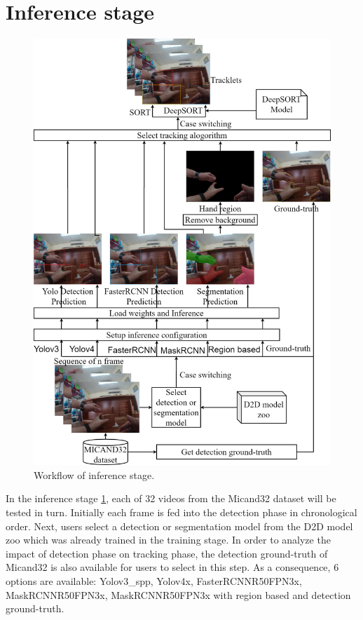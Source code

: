 \section{Inference stage}\label{sec:inferstage}
\begin{figure}[htbp]
	\centerline{\includegraphics[width=\textwidth]{Figs/inferenceStage.pdf}}
	\caption{Workflow of inference stage.}
	\label{fig:inferenceStage}
\end{figure}
In the inference stage \ref{fig:inferenceStage}, each of 32 videos from the Micand32 dataset will be tested in turn. Initially each frame is fed into the detection phase in chronological order. Next, users select a detection or segmentation model from the D2D model zoo which was already trained in the training stage. In order to analyze the impact of detection phase on tracking phase, the detection ground-truth of Micand32 is also available for users to select in this step. As a consequence, 6 options are available: Yolov3\_spp, Yolov4x, FasterRCNNR50FPN3x, MaskRCNNR50FPN3x, MaskRCNNR50FPN3x with region based and detection ground-truth.

